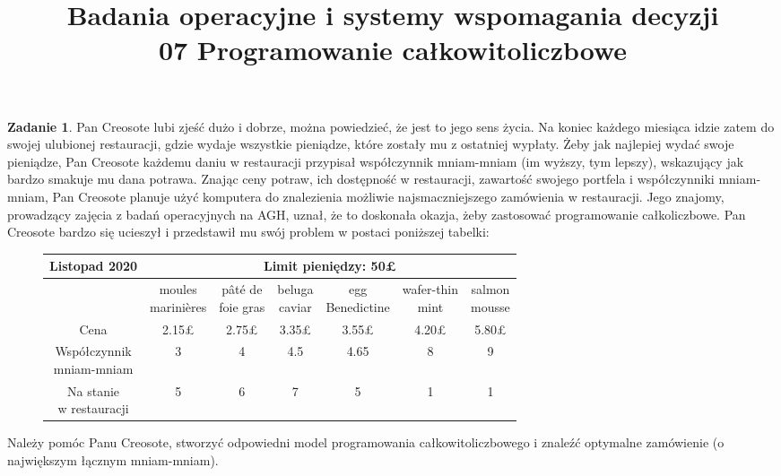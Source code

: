 \documentclass{article}[]
\newcommand{\w}{\mathbf{w}}
\theoremstyle{definition}
\newtheorem{zad}{Zadanie}
\begin{document}
\title{Badania operacyjne i systemy wspomagania decyzji
\\ \Large 07 Programowanie całkowitoliczbowe}
\date{}

\maketitle

\begin{zad}
Pan Creosote lubi zjeść dużo i dobrze, można powiedzieć, że jest to jego sens życia. Na koniec każdego miesiąca idzie zatem do swojej ulubionej restauracji, gdzie wydaje wszystkie pieniądze, które zostały mu z ostatniej wypłaty. Żeby jak najlepiej wydać swoje pieniądze, Pan Creosote każdemu daniu w restauracji przypisał współczynnik mniam-mniam (im wyższy, tym lepszy), wskazujący jak bardzo smakuje mu dana potrawa. Znając ceny potraw, ich dostępność w restauracji, zawartość swojego portfela i współczynniki mniam-mniam, Pan Creosote planuje użyć komputera do znalezienia możliwie najsmaczniejszego zamówienia w restauracji. Jego znajomy, prowadzący zajęcia z badań operacyjnych na AGH, uznał, że to doskonała okazja, żeby zastosować programowanie całkoliczbowe. Pan Creosote bardzo się ucieszył i przedstawił mu swój problem w postaci poniższej tabelki:

\begin{figure}[h!]
	\begin{tabular}{|c|c|c|c|c|c|c|}
		\hline
		Listopad 2020 & \multicolumn{6}{c|}{Limit pieniędzy: 50£} \\
		\hline
		\makecell[c]{Nazwa dania} & \makecell[c]{moules \\marinières} & \makecell[c]{pâté de\\foie gras} & \makecell[c]{beluga\\caviar} & \makecell[c]{egg\\Benedictine} & \makecell[c]{wafer-thin\\ mint} & \makecell[c]{salmon\\mousse} \\
		\hline
		Cena & 2.15£ & 2.75£ & 3.35£ & 3.55£ & 4.20£ & 5.80£ \\
		\hline
		\makecell[c]{Współczynnik\\mniam-mniam}  & 3 & 4 & 4.5 & 4.65 & 8 & 9 \\
		\hline
		\makecell[c]{Na stanie\\w restauracji} & 5 & 6 & 7 & 5 & 1 & 1 \\
		\hline
	\end{tabular}
\end{figure}


Należy pomóc Panu Creosote, stworzyć odpowiedni model programowania całkowitoliczbowego i znaleźć optymalne zamówienie (o największym łącznym mniam-mniam).

\end{zad}
\end{document}
